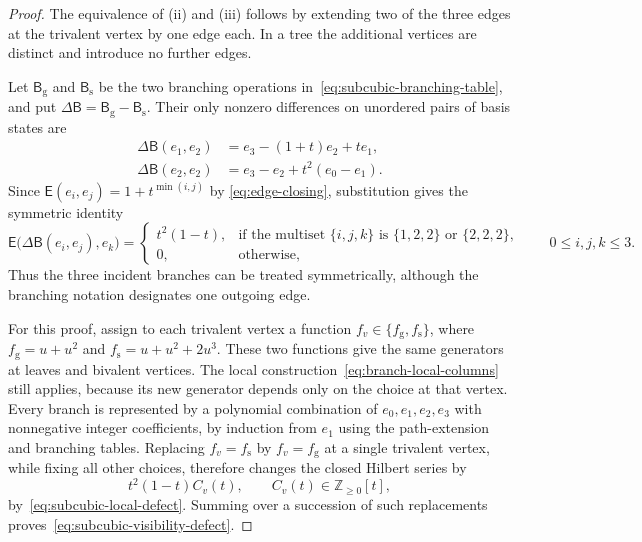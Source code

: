 \documentclass[reqno]{article}
\theoremstyle{plain} %
\theoremstyle{definition}
\theoremstyle{remark}
\newcommand{\Z}{{\mathbb{Z}}}
\numberwithin{equation}{section}
\begin{document}
\begin{proof}
The equivalence of (ii) and (iii) follows by extending two of the three
edges at the trivalent vertex by one edge each. In a tree the additional
vertices are distinct and introduce no further edges.

Let $\mathsf B_{\mathrm g}$ and $\mathsf B_{\mathrm s}$ be the two
branching operations in~\eqref{eq:subcubic-branching-table}, and put
$\Delta\mathsf B=\mathsf B_{\mathrm g}-\mathsf B_{\mathrm s}$.
Their only nonzero differences on unordered pairs of basis states are
\begin{align*}
\Delta\mathsf B(e_1,e_2)
 &=e_3-(1+t)e_2+te_1,\\
\Delta\mathsf B(e_2,e_2)
 &=e_3-e_2+t^2(e_0-e_1).
\end{align*}
Since $\mathsf E(e_i,e_j)=1+t^{\min(i,j)}$ by
\eqref{eq:edge-closing}, substitution gives the symmetric identity
\begin{equation}\label{eq:subcubic-local-defect}
\mathsf E\bigl(\Delta\mathsf B(e_i,e_j),e_k\bigr)
=\begin{cases}
 t^2(1-t),&\text{if the multiset }\{i,j,k\}\text{ is }
                   \{1,2,2\}\text{ or }\{2,2,2\},\\
 0,&\text{otherwise},
\end{cases}
\qquad 0\le i,j,k\le3.
\end{equation}
Thus the three incident branches can be treated symmetrically, although
the branching notation designates one outgoing edge.

For this proof, assign to each trivalent vertex a function
$f_v\in\{f_{\mathrm g},f_{\mathrm s}\}$, where
$f_{\mathrm g}=u+u^2$ and $f_{\mathrm s}=u+u^2+2u^3$. These two
functions give the same generators at leaves and bivalent vertices.
The local construction~\eqref{eq:branch-local-columns} still applies,
because its new generator depends only on the choice at that vertex.
Every branch is represented by a polynomial combination of $e_0,e_1,e_2,e_3$
with nonnegative integer coefficients, by induction from $e_1$ using the
path-extension and branching tables. Replacing $f_v=f_{\mathrm s}$ by
$f_v=f_{\mathrm g}$ at a single trivalent vertex, while fixing all
other choices, therefore changes the closed Hilbert series by
\[
t^2(1-t)C_v(t),\qquad C_v(t)\in\Z_{\ge0}[t],
\]
by~\eqref{eq:subcubic-local-defect}. Summing over a succession of such
replacements proves~\eqref{eq:subcubic-visibility-defect}.


\end{proof}
\end{document}
